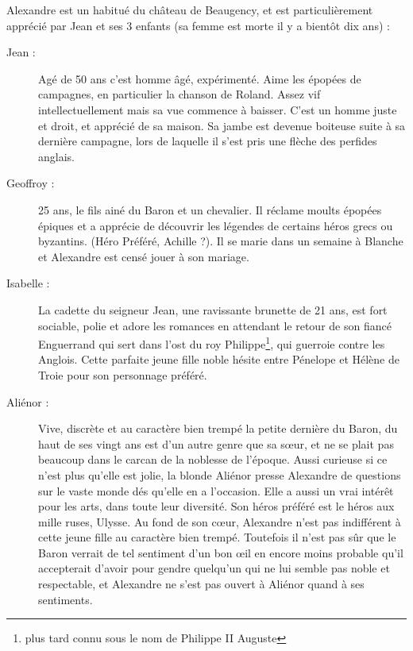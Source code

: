 Alexandre est un habitué du château de Beaugency, et est particulièrement apprécié par Jean et ses 3 enfants (sa femme est morte il y a bientôt dix ans) :
\begin{description}
\item[Jean :] Agé de 50 ans c'est homme âgé, expérimenté.
Aime les épopées de campagnes, en particulier la chanson de Roland.
Assez vif intellectuellement mais sa vue commence à baisser.
C'est un homme juste et droit, et apprécié de sa maison. Sa jambe est devenue boiteuse suite à sa dernière campagne, lors de laquelle il s'est pris une flèche des perfides anglais.
\item[Geoffroy :] 25 ans, le fils ainé du Baron et un chevalier. Il réclame moults épopées épiques et a apprécie de découvrir les légendes de certains héros grecs ou byzantins. (Héro Préféré, Achille ?). Il se marie dans un semaine à Blanche et Alexandre est censé jouer à son mariage.
\item[Isabelle :] La cadette du seigneur Jean, une ravissante brunette de 21 ans, est fort sociable, polie et adore les romances en attendant le retour de son fiancé Enguerrand qui sert dans l'ost du roy Philippe\footnote{plus tard connu sous le nom de Philippe II Auguste}, qui guerroie contre les Anglois. Cette parfaite jeune fille noble hésite entre Pénelope et Hélène de Troie pour son personnage préféré.
\item[Aliénor :] Vive, discrète et au caractère bien trempé la petite dernière du Baron, du haut de ses vingt ans est d'un autre genre que sa sœur, et ne se plait pas beaucoup dans le carcan de la noblesse de l'époque. Aussi curieuse si ce n'est plus qu'elle est jolie, la blonde Aliénor presse Alexandre de questions sur le vaste monde dés qu'elle en a l'occasion. Elle a aussi un vrai intérêt pour les arts, dans toute leur diversité. Son héros préféré est le héros aux mille ruses, Ulysse. Au fond de son cœur, Alexandre n'est pas indifférent à cette jeune fille au caractère bien trempé. Toutefois il n'est pas sûr que le Baron verrait de tel sentiment d'un bon œil en encore moins probable qu'il accepterait d'avoir pour gendre quelqu'un qui ne lui semble pas noble et respectable, et Alexandre ne s'est pas ouvert à Aliénor quand à ses sentiments.
\end{description}

